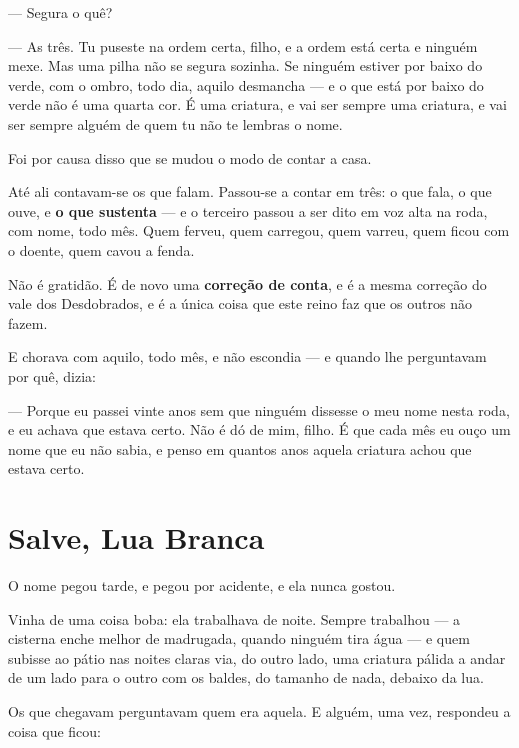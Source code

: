 \documentclass[livro.tex]{subfiles}
\begin{document}
--- Segura o quê?

--- As três. Tu puseste na ordem certa, filho, e a ordem está certa e ninguém mexe. Mas uma pilha
não se segura sozinha. Se ninguém estiver por baixo do verde, com o ombro, todo dia, aquilo
desmancha --- e o que está por baixo do verde não é uma quarta cor. É uma criatura, e vai ser
sempre uma criatura, e vai ser sempre alguém de quem tu não te lembras o nome.

\medskip

Foi por causa disso que se mudou o modo de contar a casa.

Até ali contavam-se os que falam. Passou-se a contar em três: o que fala, o que ouve, e \textbf{o
que sustenta} --- e o terceiro passou a ser dito em voz alta na roda, com nome, todo mês. Quem
ferveu, quem carregou, quem varreu, quem ficou com o doente, quem cavou a fenda.

Não é gratidão. É de novo uma \textbf{correção de conta}, e é a mesma correção do vale dos
Desdobrados, e é a única coisa que este reino faz que os outros não fazem.

\medskip

E \Lua chorava com aquilo, todo mês, e não escondia --- e quando lhe perguntavam por quê, dizia:

--- Porque eu passei vinte anos sem que ninguém dissesse o meu nome nesta roda, e eu achava que
estava certo. Não é dó de mim, filho. É que cada mês eu ouço um nome que eu não sabia, e penso em
quantos anos aquela criatura achou que estava certo.

\section{Salve, Lua Branca}

O nome pegou tarde, e pegou por acidente, e ela nunca gostou.

\medskip

Vinha de uma coisa boba: ela trabalhava de noite. Sempre trabalhou --- a cisterna enche melhor de
madrugada, quando ninguém tira água --- e quem subisse ao pátio nas noites claras via, do outro
lado, uma criatura pálida a andar de um lado para o outro com os baldes, do tamanho de nada,
debaixo da lua.

Os que chegavam perguntavam quem era aquela. E alguém, uma vez, respondeu a coisa que ficou:
\end{document}
